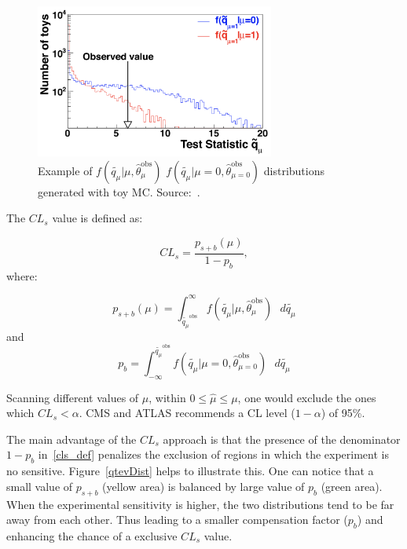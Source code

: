\begin{figure}[htbp]
  \centering
  \includegraphics[width=0.7\textwidth,keepaspectratio]{figures/cls/q_tilde.png}
  \caption{Example of $f(\tilde{q_{\mu}} \vert \mu, \hat{\theta}_{\mu}^{\text{obs}})$ $f(\tilde{q_{\mu}} \vert \mu=0, \hat{\theta}_{\mu = 0}^{\text{obs}})$ distributions generated with toy MC. Source:~\cite{cms_atlas_statistical_guidelines}.}
  \label{toy_mc_profile_likelihood_test}
\end{figure}

The $CL_s$ value is defined as:

\begin{equation}
  \label{cls_def}
  CL_s=\frac{p_{s+b}(\mu)}{1-p_{b}},
\end{equation}
where:

\begin{equation}
  \label{cls_p_def1}
  p_{s+b}(\mu) = \int_{\tilde{q_{\mu}}^{\text{obs}}}^{\infty} f(\tilde{q_{\mu}} \vert \mu, \hat{\theta}_{\mu}^{\text{obs}}) \text{ }d\tilde{q_{\mu}}
\end{equation}
and
\begin{equation}
  \label{cls_p_def2}
  p_{b} = \int^{\tilde{q_{\mu}}^{\text{obs}}}_{-\infty} f(\tilde{q_{\mu}} \vert \mu=0, \hat{\theta}_{\mu = 0}^{\text{obs}}) \text{ }d\tilde{q_{\mu}}
\end{equation}

Scanning different values of $\mu$, within $0 \leqslant \hat{\mu} \leqslant \mu$, one would exclude the ones which $CL_s < \alpha$. CMS and ATLAS recommends a CL level ($1-\alpha$) of 95\%.

The main advantage of the $CL_s$ approach is that the presence of the denominator $1-p_{b}$ in~\ref{cls_def} penalizes the exclusion of regions in which the experiment is no sensitive. Figure~\ref{qtevDist} helps to illustrate this. One can notice that a small value of $p_{s+b}$ (yellow area) is balanced by large value of $p_{b}$ (green area). When the experimental sensitivity is higher, the two distributions tend to be far away from each other. Thus leading to a smaller compensation factor ($p_{b}$) and enhancing the chance of a exclusive $CL_s$ value.

